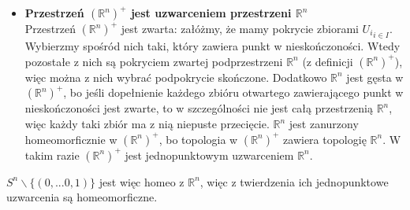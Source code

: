 \begin{itemize}
\item \textbf{Przestrzeń $(\mathbb{R}^n)^{+}$ jest uzwarceniem przestrzeni $\mathbb{R}^n$}\\
Przestrzeń $(\mathbb{R}^n)^{+}$ jest zwarta: załóżmy, że mamy pokrycie zbiorami ${U_i}_{i \in I}$. Wybierzmy spośród nich taki, który zawiera punkt w nieskończoności. Wtedy pozostałe z nich są pokryciem zwartej podprzestrzeni $\mathbb{R}^n$ (z definicji $(\mathbb{R}^n)^{+}$), więc można z nich wybrać podpokrycie skończone.
Dodatkowo $\mathbb{R}^n$ jest gęsta w $(\mathbb{R}^n)^{+}$, bo jeśli dopełnienie każdego zbióru otwartego zawierającego punkt w nieskończoności jest zwarte, to w szczególności nie jest całą przestrzenią $\mathbb{R}^n$, więc każdy taki zbiór ma z nią niepuste przecięcie.
$\mathbb{R}^n$ jest zanurzony homeomorficznie w $(\mathbb{R}^n)^{+}$, bo topologia w $(\mathbb{R}^n)^{+}$ zawiera topologię $\mathbb{R}^n$.
W takim razie $(\mathbb{R}^n)^{+}$ jest jednopunktowym uzwarceniem $\mathbb{R}^n$.
\end{itemize}

$ S^n \backslash \{(0, ... 0, 1)\}$ jest więc homeo z $\mathbb{R}^n$, więc z twierdzenia ich jednopunktowe uzwarcenia są homeomorficzne.

